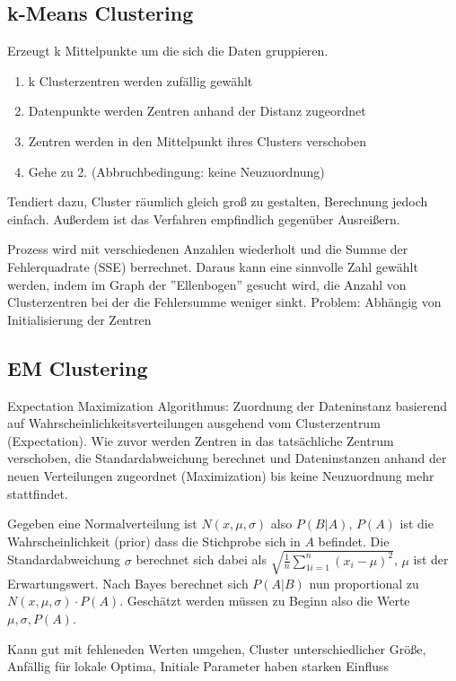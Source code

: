 \documentclass{article}
\begin{document}
\subsection{k-Means Clustering}
Erzeugt k Mittelpunkte um die sich die Daten gruppieren.
\begin{enumerate}
\item k Clusterzentren werden zufällig gewählt 
\item Datenpunkte werden Zentren anhand der Distanz zugeordnet
\item Zentren werden in den Mittelpunkt ihres Clusters verschoben
\item Gehe zu 2. (Abbruchbedingung: keine Neuzuordnung)
\end{enumerate}
Tendiert dazu, Cluster räumlich gleich groß zu gestalten, Berechnung jedoch einfach. Außerdem ist das Verfahren empfindlich gegenüber Ausreißern.

Prozess wird mit verschiedenen Anzahlen wiederholt und die Summe der Fehlerquadrate (SSE) berrechnet. 
Daraus kann eine sinnvolle Zahl gewählt werden, indem im Graph der ''Ellenbogen'' gesucht wird, die Anzahl von Clusterzentren bei der die Fehlersumme weniger sinkt.
Problem: Abhängig von Initialisierung der Zentren
\subsection{EM Clustering}

Expectation Maximization Algorithmus: Zuordnung der Dateninstanz basierend auf Wahrscheinlichkeitsverteilungen ausgehend vom Clusterzentrum (Expectation).
Wie zuvor werden Zentren in das tatsächliche Zentrum verschoben, die Standardabweichung berechnet und Dateninstanzen anhand der neuen Verteilungen zugeordnet (Maximization) 
bis keine Neuzuordnung mehr stattfindet.

Gegeben eine Normalverteilung ist $N(x, \mu, \sigma)$ also $P(B|A)$, $P(A)$ ist die Wahrscheinlichkeit (prior) dass die Stichprobe sich in $A$ befindet.
Die Standardabweichung $\sigma$ berechnet sich dabei als $\sqrt{\frac{1}{n}\sum_{1i=1}^{n}(x_{i}-\mu)^{2}} $, $\mu$ ist der Erwartungswert.
Nach Bayes berechnet sich $P(A|B)$ nun proportional zu $N(x,\mu, \sigma) \cdot P(A)$. Geschätzt werden müssen zu Beginn also die Werte $\mu, \sigma, P(A)$.


Kann gut mit fehleneden Werten umgehen, Cluster unterschiedlicher Größe,
Anfällig für lokale Optima, Initiale Parameter haben starken Einfluss
\end{document}

